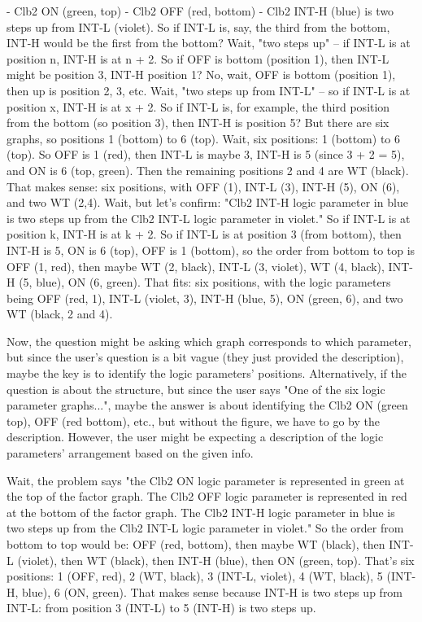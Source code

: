 - Clb2 ON (green, top)
- Clb2 OFF (red, bottom)
- Clb2 INT-H (blue) is two steps up from INT-L (violet). So if INT-L is, say, the third from the bottom, INT-H would be the first from the bottom? Wait, "two steps up" – if INT-L is at position n, INT-H is at n + 2. So if OFF is bottom (position 1), then INT-L might be position 3, INT-H position 1? No, wait, OFF is bottom (position 1), then up is position 2, 3, etc. Wait, "two steps up from INT-L" – so if INT-L is at position x, INT-H is at x + 2. So if INT-L is, for example, the third position from the bottom (so position 3), then INT-H is position 5? But there are six graphs, so positions 1 (bottom) to 6 (top). Wait, six positions: 1 (bottom) to 6 (top). So OFF is 1 (red), then INT-L is maybe 3, INT-H is 5 (since 3 + 2 = 5), and ON is 6 (top, green). Then the remaining positions 2 and 4 are WT (black). That makes sense: six positions, with OFF (1), INT-L (3), INT-H (5), ON (6), and two WT (2,4). Wait, but let's confirm: "Clb2 INT-H logic parameter in blue is two steps up from the Clb2 INT-L logic parameter in violet." So if INT-L is at position k, INT-H is at k + 2. So if INT-L is at position 3 (from bottom), then INT-H is 5, ON is 6 (top), OFF is 1 (bottom), so the order from bottom to top is OFF (1, red), then maybe WT (2, black), INT-L (3, violet), WT (4, black), INT-H (5, blue), ON (6, green). That fits: six positions, with the logic parameters being OFF (red, 1), INT-L (violet, 3), INT-H (blue, 5), ON (green, 6), and two WT (black, 2 and 4). 

Now, the question might be asking which graph corresponds to which parameter, but since the user's question is a bit vague (they just provided the description), maybe the key is to identify the logic parameters' positions. Alternatively, if the question is about the structure, but since the user says "One of the six logic parameter graphs...", maybe the answer is about identifying the Clb2 ON (green top), OFF (red bottom), etc., but without the figure, we have to go by the description. However, the user might be expecting a description of the logic parameters' arrangement based on the given info. 

Wait, the problem says "the Clb2 ON logic parameter is represented in green at the top of the factor graph. The Clb2 OFF logic parameter is represented in red at the bottom of the factor graph. The Clb2 INT-H logic parameter in blue is two steps up from the Clb2 INT-L logic parameter in violet." So the order from bottom to top would be: OFF (red, bottom), then maybe WT (black), then INT-L (violet), then WT (black), then INT-H (blue), then ON (green, top). That's six positions: 1 (OFF, red), 2 (WT, black), 3 (INT-L, violet), 4 (WT, black), 5 (INT-H, blue), 6 (ON, green). That makes sense because INT-H is two steps up from INT-L: from position 3 (INT-L) to 5 (INT-H) is two steps up. 

